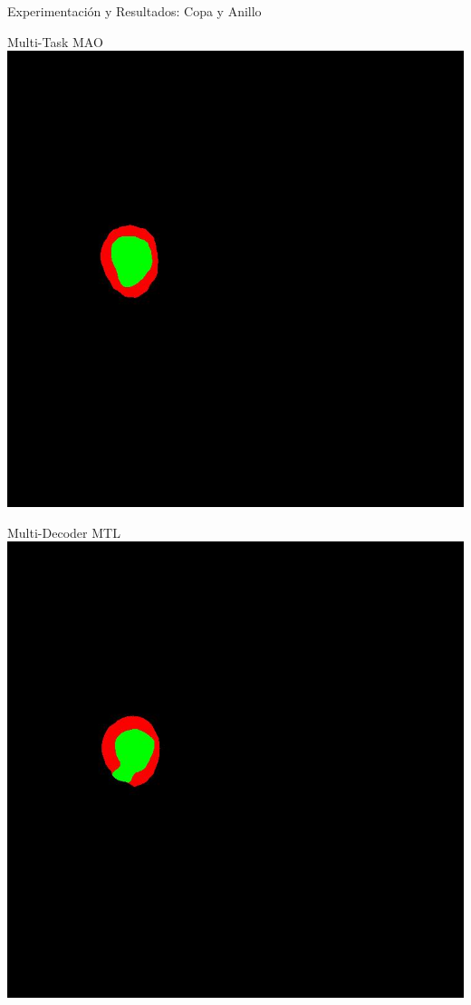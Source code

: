 \documentclass[xcolor=dvipsnames,table]{beamer}
\begin{document}
\begin{frame}{Experimentación y Resultados: Copa y Anillo}
\begin{minipage}[b]{0.13\textwidth}
	\end{minipage}\hfill
	\begin{minipage}[b]{0.13\textwidth}
		\centering
		Multi-Task MAO\\[0.2cm]
		\includegraphics[width=\linewidth]{my_images/video/HARDTASKMAO.jpg}
	\end{minipage}\hfill
	\begin{minipage}[b]{0.13\textwidth}
		\centering
		Multi-Decoder MTL\\[0.2cm]
		\includegraphics[width=\linewidth]{my_images/video/HARDMULTIMTL.jpg}

\end{minipage}
\end{frame}
\end{document}
